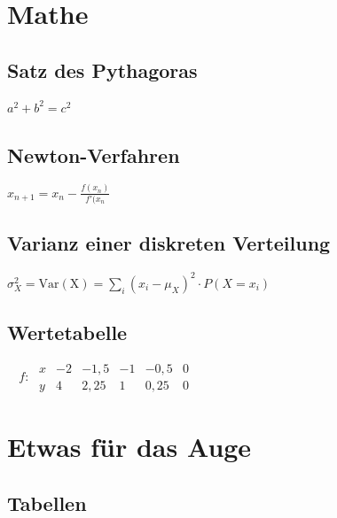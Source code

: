 \documentclass{scrreprt}
\begin{document}
\chapter{Mathe}
\label{cha:mathe}

\section{Satz des Pythagoras} 

\vspace{2pt}

$ a^{2} + b^{2} = c^{2}
\label{eq:pythagoras} $
\vspace{10pt}
\newline
\section{Newton-Verfahren}

\vspace{2pt}

$ x_{n+1} = x_{n} - \frac{f(x_{n})}{f'(x_{n}} 
\label{eq:newtonverfahren} $
\vspace{10pt}
\newline
\section{Varianz einer diskreten Verteilung} 

\vspace{2pt}

$ \sigma^2_{X} = \mathrm{Var(X)} = \sum_i (x_i - \mu_{X})^2 \cdot P(X = x_i) \label{eq:varianzdiskret} $
\vspace{10pt}
\newline
\section{Wertetabelle} 

\vspace{2pt}

$ \phantom{^{-1}}f\colon\; \begin{array}{r|c|c|c|c|c} x & -2 & -1,5 & -1 & -0,5 & 0 \\ \hline y & 4 & 2,25 & 1 & 0,25 & 0 \end{array} 
\label{eq:wertetabelle} $

\chapter{Etwas für das Auge}
\section{Tabellen}
\label{se:tabellen}
\end{document}
